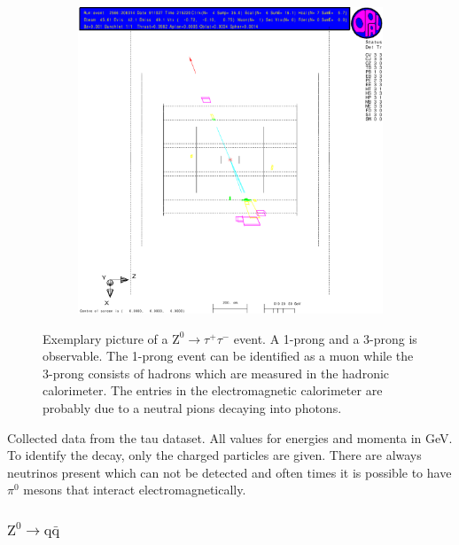 \documentclass[11pt, a4paper]{article}
\numberwithin{equation}{section}
\begin{document}
\begin{figure}[h]
	\ContinuedFloat
	\begin{subfigure}{\textwidth}
		\centering
		\includegraphics[width=.9\textwidth]{./data/tag1/tt_pics/cropped/tt_05_side}
	\end{subfigure}
	\caption{Exemplary picture of a $\mathrm{Z}^0\rightarrow \tau^+\tau^-$ event. A 1-prong and a 3-prong is observable. The 1-prong event can be identified as a muon while the 3-prong consists of hadrons which are measured in the hadronic calorimeter. The entries in the electromagnetic calorimeter are probably due to a neutral pions decaying into photons.}
	\label{fig:eventdisplay_tt}
\end{figure}
\begin{table}
	\centering
	
	\caption{Collected data from the tau dataset. All values for energies and momenta in \si{GeV}. To identify the decay, only the charged particles are given. There are always neutrinos present which can not be detected and often times it is possible to have $\pi^0$ mesons that interact electromagnetically.}
	\label{tab:eventdisplay_tt}
\end{table}
\clearpage
\subsubsection{$\mathrm{Z}^0\rightarrow \mathrm{q\bar{q}}$}
\end{document}
